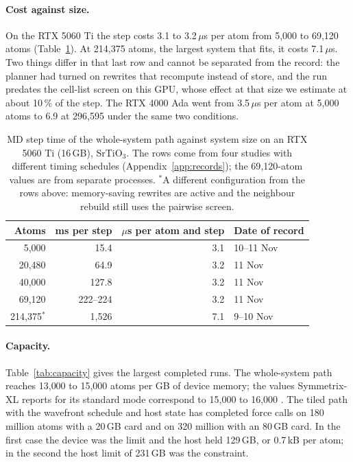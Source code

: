 \documentclass[11pt]{article}
\newcommand{\us}{\,\ensuremath{\mu}s}
\begin{document}
\paragraph{Cost against size.}
On the RTX 5060 Ti the step costs 3.1 to 3.2\us{} per atom from 5{,}000 to 69{,}120 atoms
(Table~\ref{tab:size}). At 214{,}375 atoms, the largest system that fits, it costs 7.1\us{}. Two things differ
in that last row and cannot be separated from the record: the planner had turned on rewrites that recompute
instead of store, and the run predates the cell-list screen on this GPU, whose effect at that size we estimate
at about 10\,\% of the step. The RTX 4000 Ada went from 3.5\us{} per atom at 5{,}000 atoms to 6.9 at 296{,}595
under the same two conditions.

\begin{table}[t]
\centering
\small
\begin{tabular}{rrrl}
\toprule
Atoms & ms per step & $\mu$s per atom and step & Date of record \\
\midrule
5{,}000   & 15.4     & 3.1 & 10--11 Nov \\
20{,}480  & 64.9     & 3.2 & 11 Nov \\
40{,}000  & 127.8    & 3.2 & 11 Nov \\
69{,}120  & 222--224 & 3.2 & 11 Nov \\
214{,}375$^{\ast}$ & 1{,}526  & 7.1 & 9--10 Nov \\
\bottomrule
\end{tabular}
\caption{MD step time of the whole-system path against system size on an RTX 5060 Ti (16\,GB), SrTiO$_3$. The
rows come from four studies with different timing schedules (Appendix~\ref{app:records}); the 69{,}120-atom
values are from separate processes. $^{\ast}$A different configuration from the rows above: memory-saving
rewrites are active and the neighbour rebuild still uses the pairwise screen.}
\label{tab:size}
\end{table}

\paragraph{Capacity.}
Table~\ref{tab:capacity} gives the largest completed runs. The whole-system path reaches 13{,}000 to 15{,}000
atoms per GB of device memory; the values Symmetrix-XL reports for its standard mode correspond to 15{,}000 to
16{,}000 \cite{fu2026symmetrixxl}. The tiled path with the wavefront schedule and host state has completed force
calls on 180 million atoms with a 20\,GB card and on 320 million with an 80\,GB card. In the first case the
device was the limit and the host held 129\,GB, or 0.7\,kB per atom; in the second the host limit of 231\,GB was
the constraint.
\end{document}
